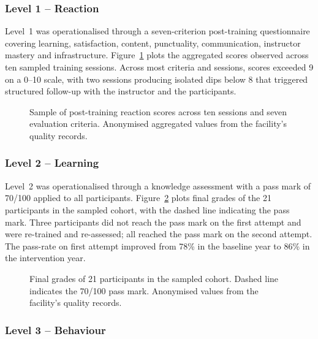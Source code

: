 \subsubsection{Level 1 -- Reaction}
\label{subsubsec:level1}

Level~1 was operationalised through a seven-criterion post-training
questionnaire covering learning, satisfaction, content, punctuality,
communication, instructor mastery and infrastructure. Figure~\ref{fig:scores-reaction}
plots the aggregated scores observed across ten sampled training sessions.
Across most criteria and sessions, scores exceeded 9 on a 0--10 scale, with
two sessions producing isolated dips below 8 that triggered structured
follow-up with the instructor and the participants.

\begin{figure}[!tbp]
  \centering
  
  \caption{Sample of post-training reaction scores across ten sessions and
           seven evaluation criteria. Anonymised aggregated values from the
           facility's quality records.}
  \label{fig:scores-reaction}
\end{figure}

\subsubsection{Level 2 -- Learning}
\label{subsubsec:level2}

Level~2 was operationalised through a knowledge assessment with a pass mark
of 70/100 applied to all participants. Figure~\ref{fig:scores-grades} plots
final grades of the 21 participants in the sampled cohort, with the dashed
line indicating the pass mark. Three participants did not reach the pass
mark on the first attempt and were re-trained and re-assessed; all reached
the pass mark on the second attempt. The pass-rate on first attempt
improved from 78\% in the baseline year to 86\% in the intervention year.

\begin{figure}[!tbp]
  \centering
  
  \caption{Final grades of 21 participants in the sampled cohort. Dashed
           line indicates the 70/100 pass mark. Anonymised values from the
           facility's quality records.}
  \label{fig:scores-grades}
\end{figure}

\subsubsection{Level 3 -- Behaviour}
\label{subsubsec:level3}

